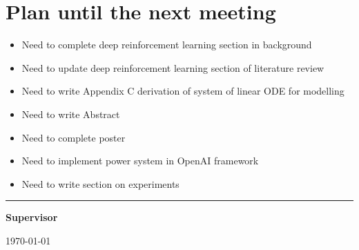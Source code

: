 \documentclass[12pt]{article}
\begin{document}
	\section{Plan until the next meeting}
	\begin{itemize}
		\item Need to complete deep reinforcement learning section in background
		\item Need to update deep reinforcement learning section of literature review
		\item Need to write Appendix C derivation of system of linear ODE for modelling 
		\item Need to write Abstract
		\item Need to complete poster
		\item Need to implement power system in OpenAI framework
		\item Need to write section on experiments
	\end{itemize}
	\par
	\vspace{\fill}%
	\noindent\rule{0.4\linewidth}{0.5pt}%
	\vspace{1em}%
	\par
	\noindent\textbf{Supervisor}\vspace{1em}%
	\par
	\noindent\today
\end{document}
